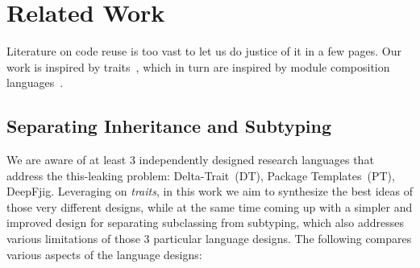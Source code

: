 \saveSpace\saveSpace
\section{Related Work}
\saveSpace\saveSpace
Literature on code reuse is too vast to let us do justice of it in a few pages.
Our work is inspired by traits~\cite{ducasse2006traits}, which in turn
are inspired by module composition languages~\cite{ancona2002calculus}.
\saveSpace
\subsection{Separating Inheritance and Subtyping}
\saveSpace
We are aware of at least 3 independently designed research languages 
that address the this-leaking problem: Delta-Trait~(DT)\cite{Bettini:2010:ISP:1774088.1774530,BETTINI2013521,Bettini2015282}, Package Templates~(PT)\cite{KrogdahlMS09,DBLP:journals/taosd/AxelsenSKM12,DBLP:conf/gpce/AxelsenK12}, DeepFjig\cite{deep,servetto2014meta,fjig}.
Leveraging on \emph{traits}, in this work we aim to synthesize
the best ideas of those very different designs, while at the same time 
coming up with a simpler and improved design for separating
subclassing from subtyping, which also addresses various limitations of those
3 particular language designs.
The following compares 
various aspects of the language designs:

